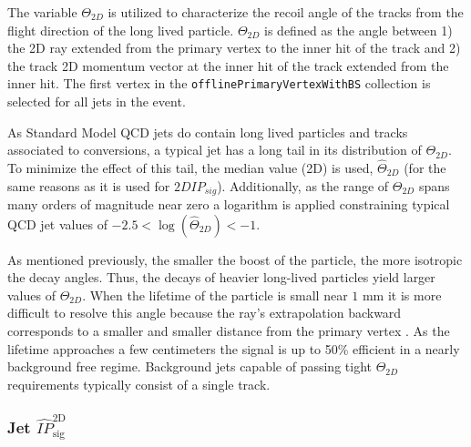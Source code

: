 The variable $\Theta_{2D}$ is utilized to characterize the recoil angle
of the tracks from the flight direction of the long lived particle. $\Theta_{2D}$ is defined as the angle between 1) the 2D ray extended from the primary vertex
to the inner hit of the track and 2) the track 2D momentum vector at the inner hit of the track extended from the inner hit. The first vertex in the
\texttt{offlinePrimaryVertexWithBS} collection is selected for all jets in the event.

As Standard Model QCD jets do contain long lived particles and tracks associated to conversions,
a typical jet has a  long tail in its distribution of $\Theta_{2D}$. To minimize the effect of this tail, the median value (2D) is used, $\hat{\Theta}_{2D}$ (for the same reasons as it is used for $2DIP_{sig}$). Additionally, as the range of $\Theta_{2D}$ spans many orders of magnitude near zero a logarithm is 
applied constraining typical QCD jet values of $-2.5 <\log(\hat{\Theta}_{2D}) < -1$. 

As mentioned previously, the smaller the boost of the particle, the more isotropic the decay angles. Thus, the decays of heavier long-lived particles
 yield larger values of $\Theta_{2D}$. When the lifetime of the particle is small near $1$ mm it is more difficult to resolve this angle because the
ray's extrapolation backward corresponds to a smaller and smaller distance from the primary vertex .
 As the lifetime approaches a few centimeters the signal is up to 50\% efficient in a nearly background free regime. Background jets capable of passing
tight $\Theta_{2D}$ requirements typically consist of a single track. 

\subsubsection{Jet $\hat{IP}_{\textrm{sig}}^{\textrm{2D}}$}

